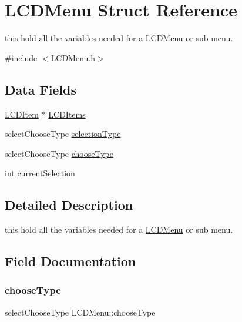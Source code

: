 \hypertarget{structLCDMenu}{}\section{L\+C\+D\+Menu Struct Reference}
\label{structLCDMenu}


this hold all the variables needed for a \hyperlink{structLCDMenu}{L\+C\+D\+Menu} or sub menu.  




{\ttfamily \#include $<$L\+C\+D\+Menu.\+h$>$}

\subsection*{Data Fields}
\begin{DoxyCompactItemize}
\item 
\hyperlink{structLCDItem}{L\+C\+D\+Item} $\ast$ \hyperlink{structLCDMenu_a5062cf64656db6299e699dcdacd1ba85}{L\+C\+D\+Items}
\item 
select\+Choose\+Type \hyperlink{structLCDMenu_ad6a65fea09794de97086121d7b72a2ac}{selection\+Type}
\item 
select\+Choose\+Type \hyperlink{structLCDMenu_ad1809ae9f0c9204d7c93390d291d3dcf}{choose\+Type}
\item 
int \hyperlink{structLCDMenu_a1f55c3e181f20c796ec51e74b70887f7}{current\+Selection}
\end{DoxyCompactItemize}


\subsection{Detailed Description}
this hold all the variables needed for a \hyperlink{structLCDMenu}{L\+C\+D\+Menu} or sub menu. 

\subsection{Field Documentation}
\hypertarget{structLCDMenu_ad1809ae9f0c9204d7c93390d291d3dcf}{}\label{structLCDMenu_ad1809ae9f0c9204d7c93390d291d3dcf} 
\subsubsection{\texorpdfstring{choose\+Type}{chooseType}}
{\footnotesize\ttfamily select\+Choose\+Type L\+C\+D\+Menu\+::choose\+Type}

